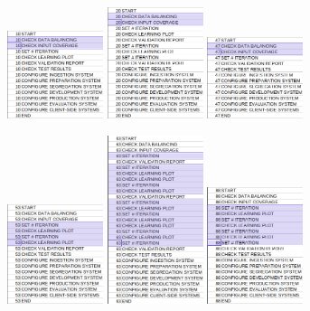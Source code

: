 \begin{figure}[H]
\centering
\includegraphics[width=0.25\textwidth]{figures/violations/10.png}
\includegraphics[width=0.25\textwidth]{figures/violations/20.png}
\includegraphics[width=0.25\textwidth]{figures/violations/47.png}
\vspace{0.2cm}

\includegraphics[width=0.25\textwidth]{figures/violations/53.png}
\includegraphics[width=0.25\textwidth]{figures/violations/63.png}
\includegraphics[width=0.25\textwidth]{figures/violations/88.png}
\vspace{0.2cm}


\end{figure}
